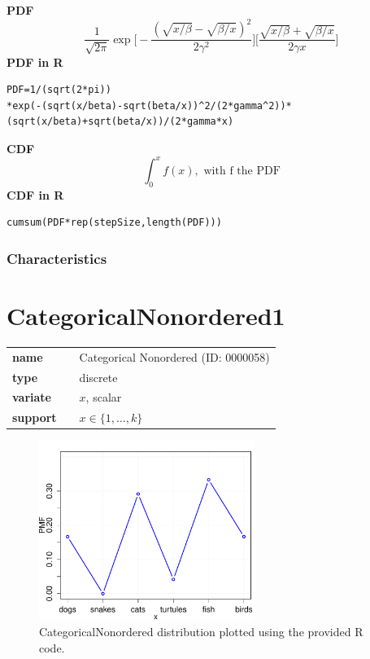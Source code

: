 \smallskip \noindent \hspace{.2cm} \textbf{PDF} 
\begin{equation*}\frac{1}{\sqrt{2\pi}}\exp\Big[-\frac{(\sqrt{x/\beta}-\sqrt{\beta/x})^2}{2\gamma^2}\Big]\Big[\frac{\sqrt{x/\beta}+\sqrt{\beta/x}}{2\gamma x}\Big]\end{equation*}
\smallskip \noindent \hspace{.2cm} \textbf{PDF in R}  
\begin{verbatim}PDF=1/(sqrt(2*pi))
*exp(-(sqrt(x/beta)-sqrt(beta/x))^2/(2*gamma^2))*(sqrt(x/beta)+sqrt(beta/x))/(2*gamma*x)
\end{verbatim}
\smallskip \noindent \hspace{.2cm} \textbf{CDF} 
\begin{equation*}\int_0^x f(x),
\text { with f the PDF}\end{equation*}
\smallskip \noindent \hspace{.2cm} \textbf{CDF in R}  
\begin{verbatim}
cumsum(PDF*rep(stepSize,length(PDF)))
\end{verbatim}
\smallskip
\subsubsection*{Characteristics}
\smallskip
\section*{CategoricalNonordered1} 

  \bigskip 

\begin{tabular}{p{2cm}cl}
\textbf{name} & & Categorical Nonordered (ID: 0000058)\\ 
 
\textbf{type} & & discrete \\ 

\textbf{variate} & & $x$, scalar \\ 

\textbf{support} & & $x \in \{1,\dots,k\}$
\end{tabular}

\begin{figure}[ht!]
\centering
  \includegraphics[width=70mm]{pics/CategoricalNonordered.pdf}
 \caption{CategoricalNonordered distribution plotted using the provided R code.}
 \label{fig:CategoricalNonordered}
\end{figure}

